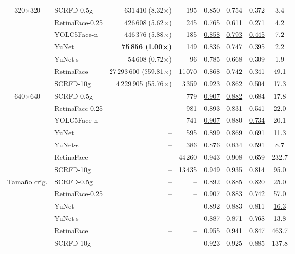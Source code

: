 \begin{scriptsize}
\begin{longtable}{c|l|r|r|c|c|c|c}
    \hline
    \endlastfoot
    
    320$\times$320 & SCRFD-0.5g & 631\,410 (8.32×) & 195 & 0.850 & 0.754 & 0.372 & 3.4\\
    & RetinaFace-0.25 & 426\,608 (5.62×) & 245 & 0.765 & 0.611 & 0.271 & 4.2\\
    & YOLO5Face-n & 446\,376 (5.88×) & 185 & \underline{0.858} & \underline{0.793} & \underline{0.445} & 7.2\\
    & YuNet & \textbf{75\,856 (1.00×)} & \underline{149} & 0.836 & 0.747 & 0.395 & \underline{2.2}\\
    & YuNet-s & 54\,608 (0.72×) & 96 & 0.785 & 0.668 & 0.309 & 1.9\\
    & RetinaFace & 27\,293\,600 (359.81×) & 11\,070 & 0.868 & 0.742 & 0.341 & 49.1\\
    & SCRFD-10g & 4\,229\,905 (55.76×) & 3\,359 & 0.923 & 0.862 & 0.504 & 17.3\\
    \hline
    640$\times$640 & SCRFD-0.5g & -- & 779 & \underline{0.907} & \underline{0.882} & 0.684 & 17.8\\
    & RetinaFace-0.25 & -- & 981 & 0.893 & 0.831 & 0.541 & 22.0\\
    & YOLO5Face-n & -- & 741 & \underline{0.907} & 0.880 & \underline{0.734} & 20.1\\
    & YuNet & -- & \underline{595} & 0.899 & 0.869 & 0.691 & \underline{11.3}\\
    & YuNet-s & -- & 386 & 0.876 & 0.834 & 0.591 & 8.7\\
    & RetinaFace & -- & 44\,260 & 0.943 & 0.908 & 0.659 & 232.7\\
    & SCRFD-10g & -- & 13\,435 & 0.949 & 0.935 & 0.814 & 95.0\\
    \hline
    Tamaño orig. & SCRFD-0.5g & -- & -- & 0.892 & \underline{0.885} & \underline{0.820} & 25.0\\
    & RetinaFace-0.25 & -- & -- & \underline{0.907} & 0.883 & 0.742 & 57.0\\
    & YuNet & -- & -- & 0.892 & 0.883 & 0.811 & \underline{16.3}\\
    & YuNet-s & -- & -- & 0.887 & 0.871 & 0.768 & 13.8\\
    & RetinaFace & -- & -- & 0.955 & 0.941 & 0.847 & 463.7\\
    & SCRFD-10g & -- & -- & 0.923 & 0.925 & 0.885 & 137.8\\
    
\end{longtable}
\end{scriptsize}


